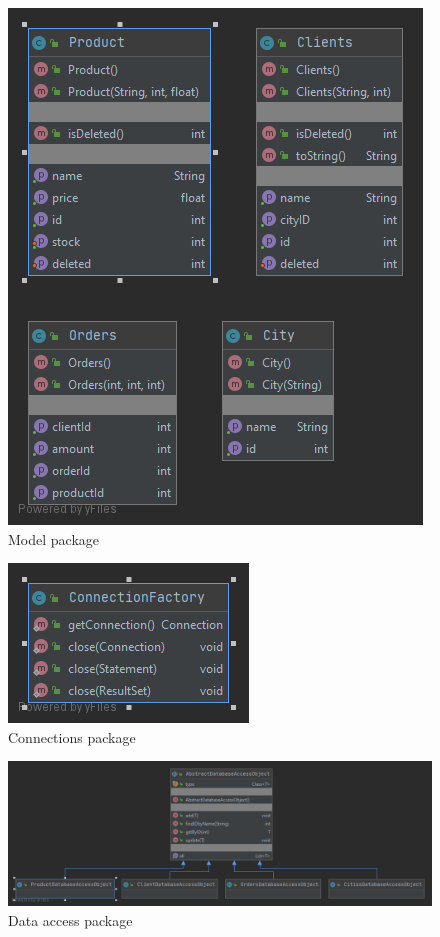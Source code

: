\documentclass[10pt,a4paper]{article}
\begin{document}
\FloatBarrier
\begin{figure}[!htb]
\centering
\includegraphics[scale=0.40]{model.png}
\caption{Model package}
\end{figure}
\FloatBarrier
\begin{figure}[!htb]
\centering
\includegraphics[scale=0.40]{connections.png}
\caption{Connections package}
\end{figure}
\FloatBarrier
\begin{figure}[!htb]
\centering
\includegraphics[scale=0.40]{dataaccess.png}
\caption{Data access package}
\end{figure}
\end{document}
